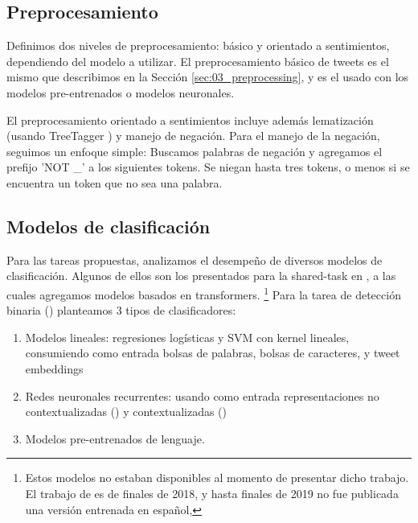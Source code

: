 \subsection{Preprocesamiento}
\label{sec:04_preprocessing}

Definimos dos niveles de preprocesamiento: básico y orientado a sentimientos, dependiendo del modelo a utilizar. El preprocesamiento básico de tweets es el mismo que describimos en la Sección \ref{sec:03_preprocessing}, y es el usado con los modelos pre-entrenados o modelos neuronales.

El preprocesamiento orientado a sentimientos incluye además lematización (usando TreeTagger \cite{schmid95}) y manejo de negación. Para el manejo de la negación, seguimos un enfoque simple:
Buscamos palabras de negación y agregamos el prefijo 'NOT \_' a los siguientes tokens. Se niegan hasta tres tokens, o menos si se encuentra un token que no sea una palabra.

\subsection{Modelos de clasificación}
\label{sec:04_classifiers}

Para las tareas propuestas, analizamos el desempeño de diversos modelos de clasificación. Algunos de ellos son los presentados para la shared-task \hateval{} en \citet{perez-2019-atalaya}, a las cuales agregamos modelos basados en transformers. \footnote{Estos modelos no estaban disponibles al momento de presentar dicho trabajo. El trabajo de \bert{} \cite{devlin2018bert} es de finales de 2018, y hasta finales de 2019 no fue publicada una versión entrenada en español, \beto{}} Para la tarea de detección binaria (\subtaska{}) planteamos 3 tipos de clasificadores:

\begin{enumerate}
    \item Modelos lineales: regresiones logísticas y SVM con kernel lineales, consumiendo como entrada bolsas de palabras, bolsas de caracteres, y tweet embeddings
    \item Redes neuronales recurrentes: usando como entrada representaciones no contextualizadas (\fasttext{}) y  contextualizadas (\elmo{})
    \item Modelos pre-entrenados de lenguaje.
\end{enumerate}

